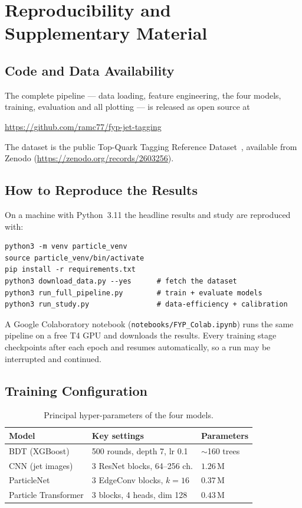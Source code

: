 \chapter{Reproducibility and Supplementary Material}
\label{chap:appendix_a}

\section{Code and Data Availability}
\label{sec:availability}

The complete pipeline --- data loading, feature engineering, the four models,
training, evaluation and all plotting --- is released as open source at
\begin{center}
\url{https://github.com/ramc77/fyp-jet-tagging}
\end{center}
The dataset is the public Top-Quark Tagging Reference
Dataset~\citep{kasieczka2019dataset}, available from Zenodo
(\url{https://zenodo.org/records/2603256}).

\section{How to Reproduce the Results}
\label{sec:reproduce}

On a machine with Python~3.11 the headline results and study are reproduced
with:
{\small\begin{verbatim}
python3 -m venv particle_venv
source particle_venv/bin/activate
pip install -r requirements.txt
python3 download_data.py --yes      # fetch the dataset
python3 run_full_pipeline.py        # train + evaluate models
python3 run_study.py                # data-efficiency + calibration
\end{verbatim}}
A Google Colaboratory notebook (\texttt{notebooks/FYP\_Colab.ipynb}) runs the
same pipeline on a free T4 GPU and downloads the results. Every training stage
checkpoints after each epoch and resumes automatically, so a run may be
interrupted and continued.

\section{Training Configuration}
\label{sec:config}

\begin{table}[htbp]
\centering
\caption{Principal hyper-parameters of the four models.}
\label{tab:hyperparams}
\begin{tabular}{@{}lll@{}}
\toprule
\textbf{Model} & \textbf{Key settings} & \textbf{Parameters} \\
\midrule
BDT (XGBoost)        & 500 rounds, depth 7, lr 0.1   & $\sim$160 trees \\
CNN (jet images)     & 3 ResNet blocks, 64--256 ch.  & $1.26$\,M \\
ParticleNet          & 3 EdgeConv blocks, $k=16$     & $0.37$\,M \\
Particle Transformer & 3 blocks, 4 heads, dim 128    & $0.43$\,M \\
\bottomrule
\end{tabular}
\end{table}

